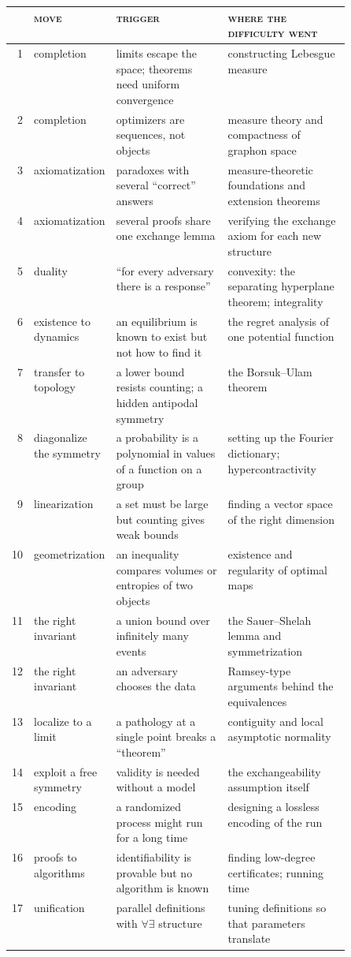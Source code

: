 \begin{refsection}
\begin{fullwidth}
\small
\renewcommand{\arraystretch}{1.22}
\begin{tabularx}{\linewidth}{@{}r>{\raggedright}p{0.17\linewidth}>{\raggedright}p{0.33\linewidth}X@{}}
\toprule
 & \textsc{move} & \textsc{trigger} & \textsc{where the difficulty went}\\
\midrule
1 & completion & limits escape the space; theorems need uniform convergence & constructing Lebesgue measure\\
2 & completion & optimizers are sequences, not objects & measure theory and compactness of graphon space\\
3 & axiomatization & paradoxes with several ``correct'' answers & measure-theoretic foundations and extension theorems\\
4 & axiomatization & several proofs share one exchange lemma & verifying the exchange axiom for each new structure\\
5 & duality & ``for every adversary there is a response'' & convexity: the separating hyperplane theorem; integrality\\
6 & existence to dynamics & an equilibrium is known to exist but not how to find it & the regret analysis of one potential function\\
7 & transfer to topology & a lower bound resists counting; a hidden antipodal symmetry & the Borsuk--Ulam theorem\\
8 & diagonalize the symmetry & a probability is a polynomial in values of a function on a group & setting up the Fourier dictionary; hypercontractivity\\
9 & linearization & a set must be large but counting gives weak bounds & finding a vector space of the right dimension\\
10 & geometrization & an inequality compares volumes or entropies of two objects & existence and regularity of optimal maps\\
11 & the right invariant & a union bound over infinitely many events & the Sauer--Shelah lemma and symmetrization\\
12 & the right invariant & an adversary chooses the data & Ramsey-type arguments behind the equivalences\\
13 & localize to a limit & a pathology at a single point breaks a ``theorem'' & contiguity and local asymptotic normality\\
14 & exploit a free symmetry & validity is needed without a model & the exchangeability assumption itself\\
15 & encoding & a randomized process might run for a long time & designing a lossless encoding of the run\\
16 & proofs to algorithms & identifiability is provable but no algorithm is known & finding low-degree certificates; running time\\
17 & unification & parallel definitions with $\forall\exists$ structure & tuning definitions so that parameters translate\\
\bottomrule
\end{tabularx}
\end{fullwidth}


\end{refsection}

